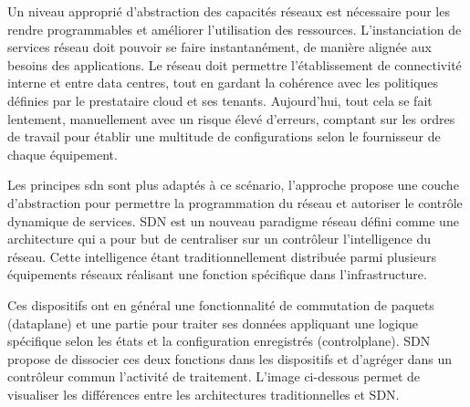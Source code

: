Un niveau approprié  d'abstraction des capacités réseaux est nécessaire pour les rendre programmables et améliorer l'utilisation des ressources. L’instanciation de services réseau doit pouvoir se faire instantanément, de manière alignée aux besoins des applications. Le réseau doit permettre l'établissement de connectivité interne et entre data centres, tout en gardant la cohérence avec les politiques définies par le prestataire cloud et ses tenants. Aujourd'hui, tout cela se fait lentement, manuellement avec un risque élevé d'erreurs, comptant sur les ordres de travail pour établir une  multitude  de configurations selon le fournisseur de chaque équipement.

Les principes \gls{sdn} sont plus adaptés à ce scénario, l'approche propose une couche d'abstraction pour permettre la programmation du réseau et autoriser le contrôle dynamique de services. SDN est un nouveau \gls{paradigme} réseau défini comme une architecture qui a pour but de centraliser  sur un contrôleur l'intelligence du réseau. Cette intelligence étant traditionnellement distribuée parmi plusieurs équipements réseaux réalisant une fonction spécifique dans l'infrastructure.

Ces dispositifs ont en général une fonctionnalité de commutation de paquets (\gls{dataplane}) et une partie pour traiter ses données appliquant une logique spécifique selon les états et la configuration enregistrés (\gls{controlplane}). SDN propose de dissocier ces deux fonctions dans les dispositifs et d'agréger dans un contrôleur commun l'activité de traitement. L'image ci-dessous permet de visualiser les différences entre les architectures traditionnelles et SDN. \\


